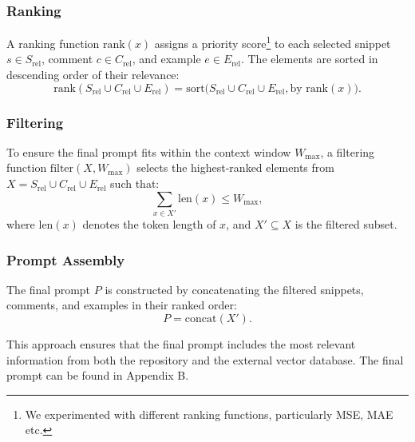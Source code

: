 \subsubsection{Ranking}
A ranking function \( \text{rank}(x) \) assigns a priority score\footnote{We experimented with different ranking functions, particularly MSE, MAE etc.} to each selected snippet \( s \in S_{\text{rel}} \), comment \( c \in C_{\text{rel}} \), and example \( e \in E_{\text{rel}} \). The elements are sorted in descending order of their relevance:
\[
\text{rank}(S_{\text{rel}} \cup C_{\text{rel}} \cup E_{\text{rel}}) = \text{sort}\big(S_{\text{rel}} \cup C_{\text{rel}} \cup E_{\text{rel}}, \text{by } \text{rank}(x)\big).
\]

\subsubsection{Filtering}
To ensure the final prompt fits within the context window \( W_{\text{max}} \), a filtering function \( \text{filter}(X, W_{\text{max}}) \) selects the highest-ranked elements from \( X = S_{\text{rel}} \cup C_{\text{rel}} \cup E_{\text{rel}} \) such that:
\[
\sum_{x \in X'} \text{len}(x) \leq W_{\text{max}},
\]
where \( \text{len}(x) \) denotes the token length of \( x \), and \( X' \subseteq X \) is the filtered subset.

\subsubsection{Prompt Assembly}
The final prompt \( P \) is constructed by concatenating the filtered snippets, comments, and examples in their ranked order:
\[
P = \text{concat}(X').
\]

This approach ensures that the final prompt includes the most relevant information from both the repository and the external vector database. The final prompt can be found in Appendix B.